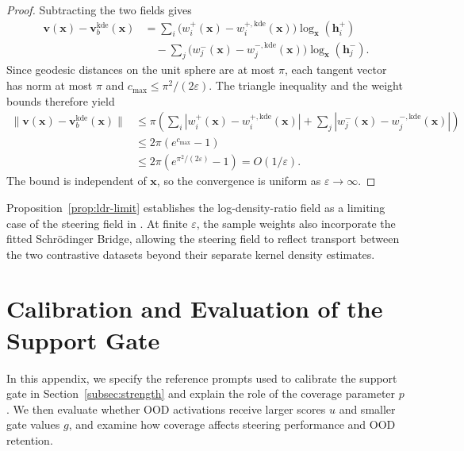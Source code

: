 \begin{proof}
Subtracting the two fields gives
\[
\begin{aligned}
\boldsymbol{v}(\boldsymbol{x})-\boldsymbol{v}_b^{\mathrm{kde}}(\boldsymbol{x})
&=\sum_i\bigl(w_i^+(\boldsymbol{x})-w_i^{+,\mathrm{kde}}(\boldsymbol{x})\bigr)\log_{\boldsymbol{x}}(\boldsymbol{h}_i^+)\\
&\quad-\sum_j\bigl(w_j^-(\boldsymbol{x})-w_j^{-,\mathrm{kde}}(\boldsymbol{x})\bigr)\log_{\boldsymbol{x}}(\boldsymbol{h}_j^-).
\end{aligned}
\]
Since geodesic distances on the unit sphere are at most $\pi$, each tangent vector has norm at most $\pi$ and $c_{\max}\le\pi^2/(2\varepsilon)$. The triangle inequality and the weight bounds therefore yield
\begin{equation}
\begin{aligned}
\|\boldsymbol{v}(\boldsymbol{x})-\boldsymbol{v}_b^{\mathrm{kde}}(\boldsymbol{x})\|
&\le\pi\left(\sum_i|w_i^+(\boldsymbol{x})-w_i^{+,\mathrm{kde}}(\boldsymbol{x})|
+\sum_j|w_j^-(\boldsymbol{x})-w_j^{-,\mathrm{kde}}(\boldsymbol{x})|\right)\\
&\le2\pi(e^{c_{\max}}-1)\\
&\le2\pi\left(e^{\pi^2/(2\varepsilon)}-1\right)
=O(1/\varepsilon).
\end{aligned}
\label{eq:prop1-bound}
\end{equation}
The bound is independent of $\boldsymbol{x}$, so the convergence is uniform as $\varepsilon\to\infty$.
\end{proof}

Proposition~\ref{prop:ldr-limit} establishes the log-density-ratio field as a limiting case of the steering field in \Cobras. At finite $\varepsilon$, the sample weights also incorporate the fitted Schr\"{o}dinger Bridge, allowing the steering field to reflect transport between the two contrastive datasets beyond their separate kernel density estimates.

\section{Calibration and Evaluation of the Support Gate}
\label{apx:ood-gate}

In this appendix, we specify the reference prompts used to calibrate the support gate in Section~\ref{subsec:strength} and explain the role of the coverage parameter $p$. We then evaluate whether OOD activations receive larger scores $u$ and smaller gate values $g$, and examine how coverage affects steering performance and OOD retention.

